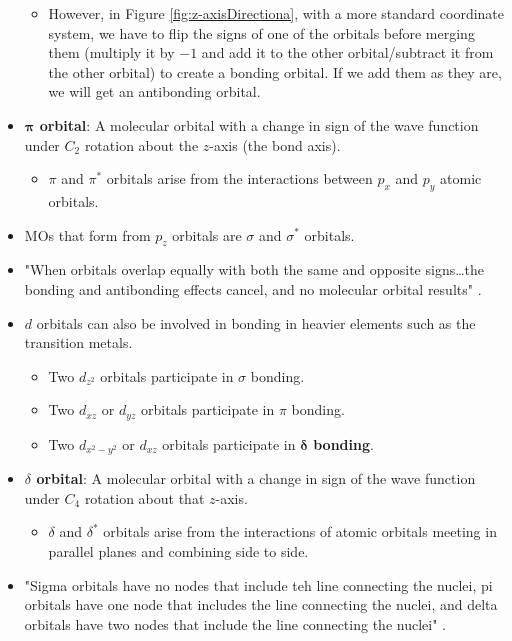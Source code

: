 \documentclass[../notes.tex]{subfiles}
\begin{document}
\begin{itemize}
\begin{itemize}
        \item However, in Figure \ref{fig:z-axisDirectiona}, with a more standard coordinate system, we have to flip the signs of one of the orbitals before merging them (multiply it by $-1$ and add it to the other orbital/subtract it from the other orbital) to create a bonding orbital. If we add them as they are, we will get an antibonding orbital.
    \end{itemize}
    \item \textbf{$\bm{\pi}$ orbital}: A molecular orbital with a change in sign of the wave function under $C_2$ rotation about the $z$-axis (the bond axis).
    \begin{itemize}
        \item $\pi$ and $\pi^*$ orbitals arise from the interactions between $p_x$ and $p_y$ atomic orbitals.
    \end{itemize}
    \item MOs that form from $p_z$ orbitals are $\sigma$ and $\sigma^*$ orbitals.
    \item "When orbitals overlap equally with both the same and opposite signs\dots the bonding and antibonding effects cancel, and no molecular orbital results" \parencite[121]{bib:MiesslerFischerTarr}.
    \item $d$ orbitals can also be involved in bonding in heavier elements such as the transition metals.
    \begin{itemize}
        \item Two $d_{z^2}$ orbitals participate in $\sigma$ bonding.
        \item Two $d_{xz}$ or $d_{yz}$ orbitals participate in $\pi$ bonding.
        \item Two $d_{x^2-y^2}$ or $d_{xz}$ orbitals participate in \textbf{$\bm{\delta}$ bonding}.
    \end{itemize}
    \item \textbf{$\delta$ orbital}: A molecular orbital with a change in sign of the wave function under $C_4$ rotation about that $z$-axis.
    \begin{itemize}
        \item $\delta$ and $\delta^*$ orbitals arise from the interactions of atomic orbitals meeting in parallel planes and combining side to side.
    \end{itemize}
    \item "Sigma orbitals have no nodes that include teh line connecting the nuclei, pi orbitals have one node that includes the line connecting the nuclei, and delta orbitals have two nodes that include the line connecting the nuclei" \parencite[121]{bib:MiesslerFischerTarr}.

\end{itemize}
\end{document}
